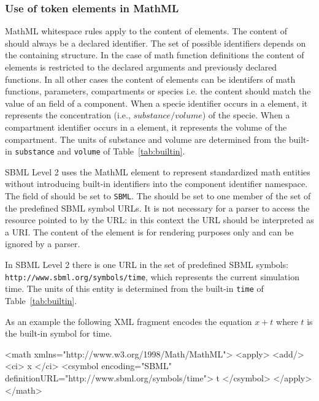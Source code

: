 \documentclass[10pt]{cekarticle}
\newcommand{\vref}[1]{\ref{#1}}
\begin{document}
\subsubsection{Use of token elements in MathML}
\label{sec:mathmltokens}
MathML whitespace rules apply to the content of 
elements. The content of  should always be a declared
identifier.  The set of possible identifiers depends on the
containing structure.  In the case of math function definitions
the content of  elements is restricted to the declared
arguments and previously declared functions. In all other cases
the content of  elements can be identifers of math
functions, parameters, compartments or species i.e. the content
should match the value of an  field of a component.
When a specie identifier occurs in a  element, it
represents the concentration (i.e., $substance/volume$) of the
specie. When a compartment identifier occurs in a 
element, it represents the volume of the compartment. The units of
substance and volume are determined from the built-in
\texttt{substance} and \texttt{volume} of
Table~\vref{tab:builtin}.

SBML Level 2 uses the MathML  element to represent
standardized math entities without introducing built-in
identifiers into the component identifier namespace.  The
 field of  should be set to
\texttt{SBML}.  The  should be set to one
member of the set of the predefined SBML symbol URLs.  It is not
necessary for a parser to access the resource pointed to by the
URL: in this context the URL should be interpreted as a URI.  The
content of the  element is for rendering purposes
only and can be ignored by a parser.

In SBML Level 2 there is one URL in the set of predefined SBML symbols:
 \texttt{http://www.sbml.org/symbols/time}, which represents the
current simulation time.  The units of this entity is determined
from the built-in \texttt{time} of Table~\vref{tab:builtin}.

As an example the following XML fragment encodes the equation $x + t$
where $t$ is the built-in symbol for time.

\begin{example}
<math xmlns="http://www.w3.org/1998/Math/MathML">
    <apply>
        <add/>
        <ci> x </ci>
        <csymbol encoding="SBML"
                    definitionURL="http://www.sbml.org/symbols/time">
            t
        </csymbol>
    </apply>
</math>
\end{example}
\end{document}
